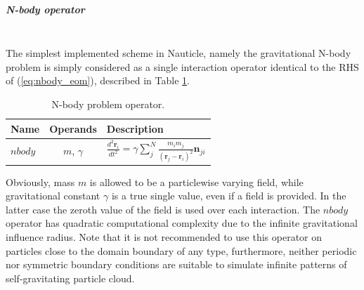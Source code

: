 \documentclass[a4paper,12pt,openany]{book}
\newcommand{\equref}[1]{(\ref{#1})}
\newcommand{\mysubparagraph}[1]{\subparagraph{#1}\mbox{}\\}
\theoremstyle{break}
\begin{document}
\mysubparagraph{N-body operator}
The simplest implemented scheme in Nauticle, namely the gravitational N-body problem is simply considered as a single interaction operator identical to the RHS of \equref{eq:nbody_eom}, described in Table \ref{tbl:nbody_op}.
\begin{table} [hbt!]
\begin{center}
\caption{N-body problem operator.}\label{tbl:nbody_op}
\begin{tabular}{ l c l }
\toprule[1.5pt]
\bf Name & \bf Operands & \bf Description \\ 
\midrule
$nbody$ & $m$, $\gamma$ & $\frac{d^2\textbf{r}_i}{dt^2}=\gamma\sum_j^N{\frac{m_im_j}{(\textbf{r}_j-\textbf{r}_i)^2}\textbf{n}_{ji}}$ \\ 
\bottomrule[1.25pt]
\end{tabular}
\end{center}
\end{table}
Obviously, mass $m$ is allowed to be a particlewise varying field, while gravitational constant $\gamma$ is a true single value, even if a field is provided. In the latter case the zeroth value of the field is used over each interaction. The $nbody$ operator has quadratic computational complexity due to the infinite gravitational influence radius. Note that it is not recommended to use this operator on particles close to the domain boundary of any type, furthermore, neither periodic nor symmetric boundary conditions are suitable to simulate infinite patterns of self-gravitating particle cloud.
\end{document}
